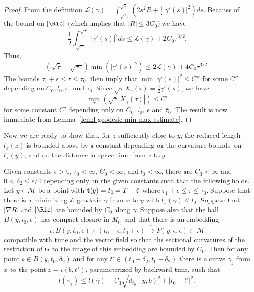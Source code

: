 \begin{proof}
From the definition
${\mathcal L}(\gamma)=\int_{\sqrt{\tau_1}}^{\sqrt{\bar\tau}}
(2s^2R+\frac{1}{2}|\gamma'(s)|^2)ds$. Because of the bound on $|\Ric|$ (which implies that $|R|\le 3C_0$) we have
$$\frac{1}{2}\int_{\sqrt{\tau_1}}^{\sqrt{\bar\tau}}|\gamma'(s)|^2ds\le {\mathcal L}(\gamma)+
2C_0\bar\tau^{3/2}.$$ Thus,
$$(\sqrt{\bar \tau}-\sqrt{\tau_1})\min(|\gamma'(s)|^2)\le 2{\mathcal L}(\gamma)+
4C_0\bar\tau^{3/2}.$$ The bounds $\tau_1+\epsilon\le \bar\tau\le\bar\tau_0$,
then imply that $\min|\gamma'(s)|^2\le C''$ for some $C''$ depending on
$C_0,l_0,\epsilon,$ and $\bar\tau_0$. Since
$\sqrt{\tau}X_\gamma(\tau)=\frac{1}{2}\gamma'(s)$, we have
$$\min_{\tau}\left(\sqrt{\tau}|X_\gamma(\tau)|\right)\le C'$$ for some constant $C'$ depending
only on $C_0$, $l_0$, $\epsilon$ and $\bar\tau_0$. The result is now immediate
from Lemma~\ref{lem:l-geodesic-min-max-estimate}.
\end{proof}

Now we are ready to show that, for $z$ sufficiently close to  $y$,
the reduced length $l_x(z)$ is bounded above by a constant depending
on the curvature bounds, on $l_x(y)$, and on the distance in
space-time from $z$ to $y$.


\begin{lemma}\label{lem:reduced-length-upper-bound-nearby}
\label{upperbd}
Given constants  $\epsilon>0$, $\bar\tau_0<\infty$, $C_0<\infty$,
and $l_0<\infty$, there are $C_3<\infty$ and $0<\delta_2\le
\epsilon/4$ depending only on the  given constants  such that the
following holds. Let $y\in {\mathcal M}$ be a point with ${\bf
t}(y)=t_0=T-\bar\tau$ where $\tau_1+\epsilon\le \bar\tau\le
\bar\tau_0$. Suppose that there is a minimizing ${\mathcal
L}$-geodesic $\gamma$ from $x$ to $y$ with $l_x(\gamma)\le l_0$.
Suppose that $|\nabla R|$ and $|\Ric|$ are bounded by $C_0$
along $\gamma$. Suppose also that the ball $B(y,t_0,\epsilon)$ has
compact closure in $M_{t_0}$ and that there is an embedding
$$\iota\colon B(y,t_0,\epsilon)\times (t_0-\epsilon,t_0+\epsilon)\stackrel
{\cong}{\longrightarrow} \tilde P(y,\epsilon,\epsilon)\subset
{\mathcal M}$$ compatible with  time  and the vector field so that
the sectional curvatures of the restriction of $G$ to the image of
this embedding are bounded by $C_0$. Then for any point $b\in
B(y,t_0,\delta_2)$ and for any $t'\in (t_0-\delta_2,t_0+\delta_2)$
there is a curve $\gamma_1$ from $x$ to the point $z=\iota(b,t')$,
parameterized by backward time, such that
$$l(\gamma_1)\le  l(\gamma)+C_3\sqrt{d_{t_0}(y,b)^2+|t_0-t'|^2}.$$
\end{lemma}


